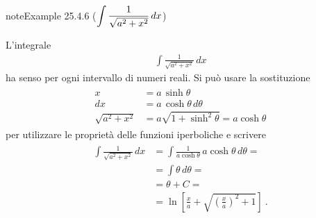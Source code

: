 \documentclass[letterpaper,10pt,italian]{jupyterBook}
\begin{document}
\begin{sphinxadmonition}{note}{Example 25.4.6 (\protect\(\displaystyle \int \frac{1}{\sqrt{a^2 + x^2}} \,  dx\protect\))}



\sphinxAtStartPar
L’integrale
\begin{equation*}
\begin{split}\int \frac{1}{\sqrt{a^2 + x^2}} \,  dx\end{split}
\end{equation*}
\sphinxAtStartPar
ha senso per ogni intervallo di numeri reali. Si può usare la sostituzione
\begin{equation*}
\begin{split}\begin{aligned}
   x & = a \, \sinh \theta \\
  dx & = a \, \cosh \theta \, d \theta \\
  \sqrt{a^2 + x^2} & = a \sqrt{1 + \sinh^2 \theta} = a \cosh \theta
\end{aligned}\end{split}
\end{equation*}
\sphinxAtStartPar
per utilizzare le proprietà delle funzioni iperboliche e scrivere
\begin{equation*}
\begin{split}\begin{aligned}
  \int \frac{1}{\sqrt{a^2 + x^2}} \, dx
   & = \int \frac{1}{a \cosh \theta} \, a \cosh \theta \, d \theta = \\
   & = \int \theta \, d \theta = \\
   & = \theta + C = \\
   & = \ln \left[ \frac{x}{a}  +  \sqrt{\left( \frac{x}{a} \right)^2 + 1} \right] \ .
\end{aligned}\end{split}
\end{equation*}\end{sphinxadmonition}
\label{ch/infinitesimal_calculus/integrals:example-12}
\end{document}
